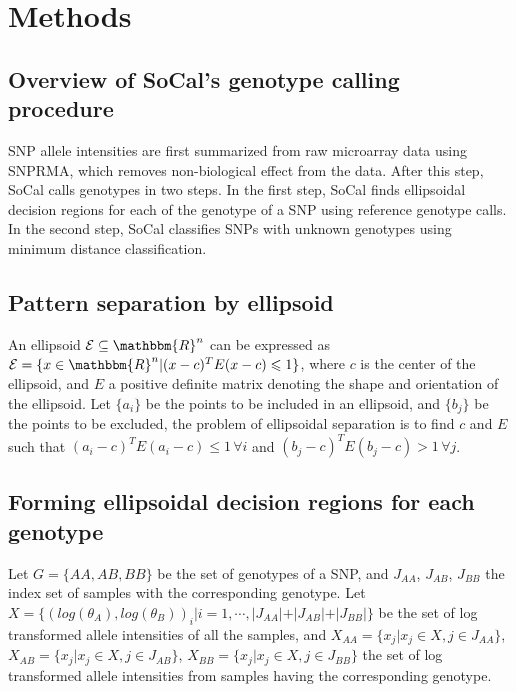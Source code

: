 \documentclass{scrartcl}
\begin{document}
\section{Methods}

\subsection{Overview of SoCal's genotype calling procedure}

\par
SNP allele intensities are first summarized from raw microarray data using
SNPRMA, which removes non-biological effect from the data.
After this step, SoCal calls genotypes in two steps.
In the first step, SoCal finds ellipsoidal decision regions for each of the
genotype of a SNP using reference genotype calls.
In the second step, SoCal classifies SNPs with unknown genotypes using
minimum distance classification.

\subsection{Pattern separation by ellipsoid}

\par
An ellipsoid $\mathcal{E} \subseteq \mathbbm{R}^{n}$ can be expressed as
$\mathcal{E} = \{x \in \mathbbm{R}^{n} | (x-c)^TE(x-c)\leqslant1\}$, where
$c$ is the center of the ellipsoid, and $E$ a positive definite matrix
denoting the shape and orientation of the ellipsoid.
Let $\{a_i\}$ be the points to be included in an ellipsoid, and $\{b_j\}$
be the points to be excluded, the problem of ellipsoidal separation is to find
$c$ and $E$ such that $(a_i-c)^TE(a_i-c)\leqslant1 \, \forall i$ and
$(b_j-c)^TE(b_j-c)>1 \, \forall j$.

\subsection{Forming ellipsoidal decision regions for each genotype}

\par
Let $G=\{AA,AB,BB\}$ be the set of genotypes of a SNP, and $J_{AA}$, $J_{AB}$,
$J_{BB}$ the index set of samples with the corresponding genotype.
Let $X=\{(log(\theta_A),log(\theta_B))_i|i=1,\cdots,
|J_{AA}|+|J_{AB}|+|J_{BB}|\}$ be the set of log transformed allele intensities
of all the samples, and $X_{AA}=\{x_j|x_j \in X, j \in J_{AA}\}$,
$X_{AB}=\{x_j|x_j \in X, j \in J_{AB}\}$,
$X_{BB}=\{x_j|x_j \in X, j \in J_{BB}\}$ the set of log transformed allele
intensities from samples having the corresponding genotype.
\end{document}
